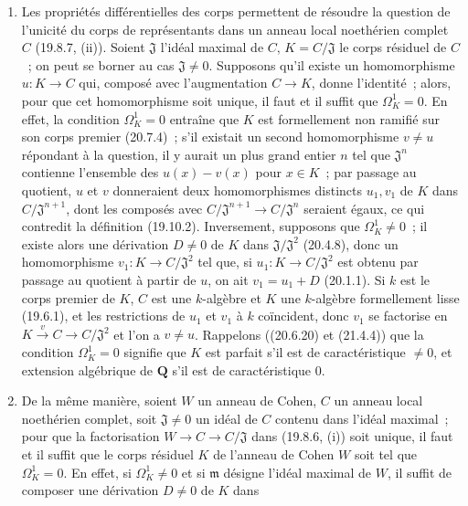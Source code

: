 \begin{remarks}[21.5.3]
\label{0.21.5.3-fr}
\begin{enumerate}
  \item[(i)] Les propriétés différentielles des corps permettent de résoudre la
  question de l'unicité du corps de représentants dans un anneau local
  noethérien complet $C$ (19.8.7, (ii)). Soient $\mathfrak J$ l'idéal maximal
  de $C$, $K=C/\mathfrak J$ le corps résiduel de $C$~; on peut se borner au
  cas $\mathfrak J\ne0$. Supposons qu'il existe un homomorphisme $u:K\to C$
  qui, composé avec l'augmentation $C\to K$, donne l'identité~; alors, pour
  que cet homomorphisme soit unique, il faut et il suffit que
  $\Omega^1_K=0$. En effet, la condition $\Omega^1_K=0$ entraîne que $K$ est
  formellement non ramifié sur son corps premier (20.7.4)~; s'il existait un
  second homomorphisme $v\ne u$ répondant à la question, il y aurait un plus
  grand entier $n$ tel que $\mathfrak J^n$ contienne l'ensemble des
  $u(x)-v(x)$ pour $x\in K$~; par passage au quotient, $u$ et $v$ donneraient
  deux homomorphismes distincts $u_1,v_1$ de $K$ dans
  $C/\mathfrak J^{n+1}$, dont les composés avec
  $C/\mathfrak J^{n+1}\to C/\mathfrak J^n$ seraient égaux, ce qui contredit
  la définition (19.10.2). Inversement, supposons que $\Omega^1_K\ne0$~; il
  existe alors une dérivation $D\ne0$ de $K$ dans
  $\mathfrak J/\mathfrak J^2$ (20.4.8), donc un homomorphisme
  $v_1:K\to C/\mathfrak J^2$ tel que, si $u_1:K\to C/\mathfrak J^2$ est
  obtenu par passage au quotient à partir de $u$, on ait $v_1=u_1+D$
  (20.1.1). Si $k$ est le corps premier de $K$, $C$ est une $k$-algèbre et
  $K$ une $k$-algèbre formellement lisse (19.6.1), et les restrictions de
  $u_1$ et $v_1$ à $k$ coïncident, donc $v_1$ se factorise en
  $K\xrightarrow{v}C\to C/\mathfrak J^2$ et l'on a $v\ne u$.
  Rappelons ((20.6.20) et (21.4.4)) que la condition $\Omega^1_K=0$ signifie
  que $K$ est parfait s'il est de caractéristique $\ne0$, et extension
  algébrique de $\mathbf Q$ s'il est de caractéristique $0$.
  \item[(ii)] De la même manière, soient $W$ un anneau de Cohen, $C$ un anneau
  local noethérien complet, soit $\mathfrak J\ne0$ un idéal de $C$ contenu dans
  l'idéal maximal~; pour que la factorisation $W\to C\to C/\mathfrak J$
  dans (19.8.6, (i)) soit unique, il faut et il suffit que le corps résiduel
  $K$ de l'anneau de Cohen $W$ soit tel que $\Omega^1_K=0$. En effet, si
  $\Omega^1_K\ne0$ et si $\mathfrak m$ désigne l'idéal maximal de $W$, il
  suffit de composer une dérivation $D\ne0$ de $K$ dans

\end{enumerate}
\end{remarks}
